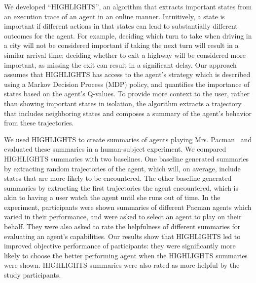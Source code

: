
We developed ``HIGHLIGHTS'', an algorithm that extracts important states from an execution trace of an agent in an online manner. Intuitively, a state is important if different actions in that states can lead to substantially different outcomes for the agent. For example, deciding which turn to take when driving in a city will not be considered important if taking the next turn will result in a similar arrival time; deciding whether to exit a highway will be considered more important, as missing the exit can result in a significant delay. Our approach assumes that HIGHLIGHTS has access to the agent's strategy which is described using a  Markov Decision Process (MDP) policy, and quantifies the importance of states based on the agent's Q-values. To provide more context to the user, rather than showing important states in isolation, the algorithm extracts a trajectory that includes neighboring states and composes a summary of the agent's behavior from these trajectories.

We used HIGHLIGHTS to create summaries of agents playing Mrs. Pacman~\cite{rohlfshagen2011ms} and evaluated these summaries in a human-subject experiment. We compared HIGHLIGHTS summaries with two baselines. One baseline generated summaries by extracting random trajectories of the agent, which will, on average, include states that are more likely to be encountered. The other baseline generated summaries by extracting the first trajectories the agent encountered, which is akin to having a user watch the agent until she runs out of time. In the experiment, participants were shown summaries of different Pacman agents which varied in their performance, and were asked to select an agent to play on their behalf.  They were also asked to rate the helpfulness of different summaries for evaluating an agent's capabilities. 
Our results show that HIGHLIGHTS led to improved objective performance of participants: they were significantly more likely to choose the better performing agent when the HIGHLIGHTS summaries were shown. HIGHLIGHTS summaries were also rated as more helpful by the study participants. 

